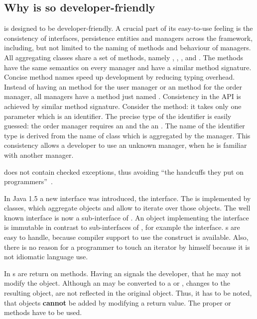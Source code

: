 \subsection{Why \salespoint{} is so developer-friendly}
\salespoint{} is designed to be developer-friendly.
A crucial part of its easy-to-use feeling is the consistency of interfaces, persistence entities and managers across the framework, including, but not limited to the naming of methods and behaviour of managers.
All aggregating classes share a set of methods, namely , , ,  and .
The methods have the same semantics on every manager and have a similar method signature.
Concise method names speed up development by reducing typing overhead.
Instead of having an  method for the user manager or an  method for the order manager, all managers have a method just named .
Consistency in the API is achieved by similar method signature.
Consider the  method: it takes only one parameter which is an identifier.
The precise type of the identifier is easily guessed: the order manager requires an  and the  an .
The name of the identifier type is derived from the name of class which is aggregated by the manager.
This consistency allows a developer to use an unknown manager, when he is familiar with another manager.

\salespoint{} does not contain checked exceptions, thus avoiding ``the handcuffs they put on programmers''~\cite{checked-exceptions}.

\label{iterable}
In Java 1.5 a new interface was introduced, the  interface.
The  is implemented by classes, which aggregate objects and allow to iterate over those objects.
The well known  interface is now a sub-interface of .
An object implementing the  interface is immutable in contrast to sub-interfaces of , for example the  interface.
s are easy to handle, because compiler support to use the  construct is available.
Also, there is no reason for a programmer to touch an iterator by himself because it is not idiomatic language use.

In \salespoint{} s are return on  methods.
Having an  signals the developer, that he may not modify the object.
Although an  may be converted to a  or , changes to the resulting object, are not reflected in the original  object.
Thus, it has to be noted, that objects \textbf{cannot} be added by modifying a \salespoint{} return value.
The proper  or  methods have to be used.

